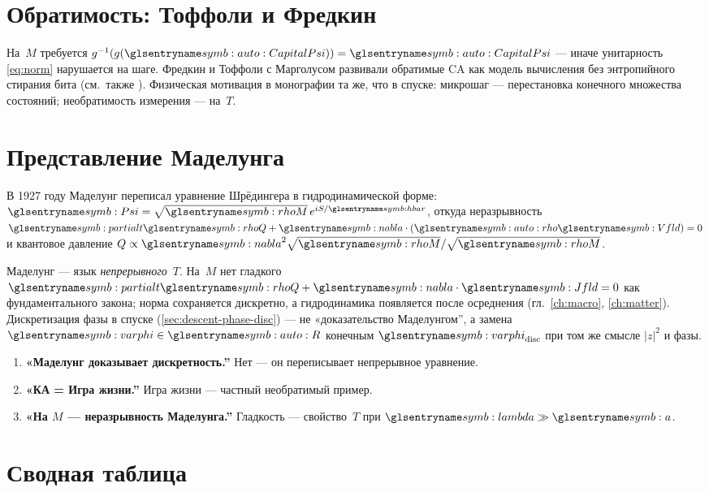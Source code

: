 \section{Обратимость: Тоффоли и Фредкин}

На~$M$ требуется $g^{-1}(g(\symCapitalPsi))=\symCapitalPsi$ --- иначе унитарность \eqref{eq:norm} нарушается на шаге.
Фредкин \cite{fredkin1990} и Тоффоли с Марголусом \cite{toffoli1987} развивали обратимые CA
как модель вычисления без энтропийного стирания бита (см.\ также \cite{bennett1973,landauer1961}).
Физическая мотивация в монографии та же, что в спуске:
микрошаг --- перестановка конечного множества состояний; необратимость измерения --- на~$T$.

\section{Представление Маделунга}

В 1927 году Маделунг \cite{madelung1927} переписал уравнение Шрёдингера в гидродинамической форме:
$\wavePsi=\sqrt{\massDensity}\,e^{iS/\planckHbar}$, откуда неразрывность $\opPartialT\chargeRho+\opNabla\cdot(\symRho\fieldV)=0$
и квантовое давление $Q\propto\opNabla^2\sqrt{\massDensity}/\sqrt{\massDensity}$.

Маделунг --- язык \emph{непрерывного}~$T$.
На~$M$ нет гладкого $\opPartialT\chargeRho+\opNabla\cdot\fieldJ=0$ как фундаментального закона;
норма сохраняется дискретно, а гидродинамика появляется после осреднения
(гл.~\ref{ch:macro}, \ref{ch:matter}).
Дискретизация фазы в спуске (\cref{sec:descent-phase-disc}) --- не «доказательство Маделунгом'',
а замена $\phaseVarphi\in\spaceR$ конечным $\phaseVarphi_{\mathrm{disc}}$ при том же смысле $|z|^2$ и фазы.

\begin{remark}
\begin{enumerate}
\item \textbf{«Маделунг доказывает дискретность.''} Нет --- он переписывает непрерывное уравнение.
\item \textbf{«КА = Игра жизни.''} Игра жизни --- частный необратимый пример.
\item \textbf{«На $M$ --- неразрывность Маделунга.''} Гладкость --- свойство~$T$ при $\lengthScale\gg\caStepSpace$.
\end{enumerate}
\end{remark}

\section{Сводная таблица}

